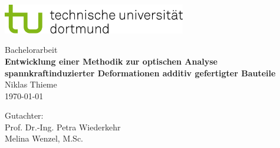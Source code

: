 \begin{titlepage}
\vspace*{-2cm}
\newlength{\links}
\setlength{\links}{-1.5cm}
\sffamily
\hspace*{\links}
\begin{minipage}{12.5cm}
\includegraphics[width=8cm]{bilder/tud_logo_rgb}
\end{minipage}

\vspace*{4cm}

\hspace*{\links}
\hspace*{-0.2cm}
\begin{minipage}{9cm}
\large
\begin{center}
{\Large Bachelorarbeit} \\
\vspace*{1cm}
\textbf{Entwicklung einer Methodik zur optischen Analyse
spannkraftinduzierter Deformationen additiv gefertigter Bauteile} \\
\vspace*{1cm}
Niklas Thieme\\
\today
\end{center}
\end{minipage}
\normalsize
\vspace*{5.5cm}


\vspace*{2.1cm}

\hspace*{\links}
\begin{minipage}[b]{5cm}
\raggedright
Gutachter: \\
Prof. Dr.-Ing. Petra Wiederkehr \\
Melina Wenzel, M.Sc. \\
\end{minipage}


\end{titlepage}

